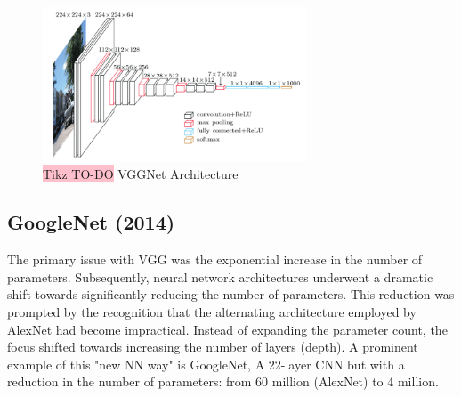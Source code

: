 \begin{figure}[!htbp]
    \centering
    \includegraphics[width=0.7\textwidth]{tikz/chapter5 - VGGNet.png}
    \caption{{\color{red}\colorbox{pink}{Tikz TO-DO}} VGGNet Architecture}
\end{figure}

\subsection{GoogleNet (2014)}
The primary issue with VGG was the exponential increase in the number of parameters. Subsequently, neural network architectures underwent a dramatic shift towards significantly reducing the number of parameters. This reduction was prompted by the recognition that the alternating architecture employed by AlexNet had become impractical. Instead of expanding the parameter count, the focus shifted towards increasing the number of layers (depth). A prominent example of this "new NN way" is GoogleNet, A 22-layer CNN but with a reduction in the number of parameters: from 60
million (AlexNet) to 4 million.

